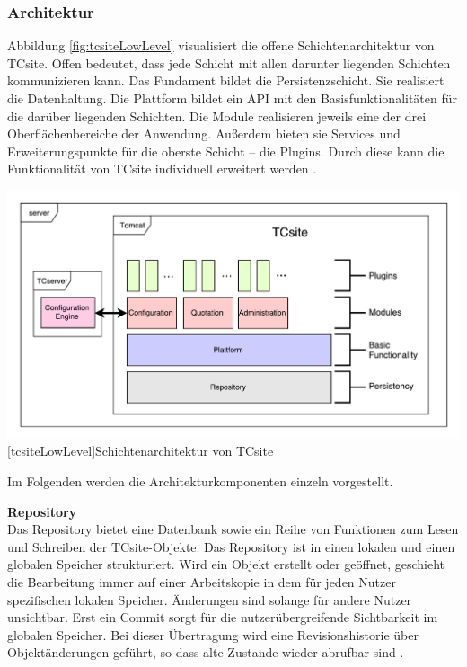 \documentclass[11pt, a4paper, titlepage, listof=totoc, bibliography=totoc, index=totoc, twoside, openright, headings=normal]{scrreprt}
\begin{document}
\subsubsection{Architektur}
\label{subsubsection:tcsiteArchitektur}

Abbildung \ref{fig:tcsiteLowLevel} visualisiert die offene Schichtenarchitektur von TCsite. Offen bedeutet, dass jede Schicht mit allen darunter liegenden Schichten kommunizieren kann. Das Fundament bildet die Persistenzschicht. Sie realisiert die Datenhaltung. Die Plattform bildet ein \ac{API} mit den Basisfunktionalitäten für die darüber liegenden Schichten. Die Module realisieren jeweils eine der drei Oberflächenbereiche der Anwendung. Außerdem bieten sie Services und Erweiterungspunkte für die oberste Schicht -- die Plugins. Durch diese kann die Funktionalität von TCsite individuell erweitert werden \citep{tactonTCsiteDevelopmentManual}.

\vspace{1em}
\begin{minipage}{\linewidth}
	\centering
	\includegraphics[width=1\linewidth]{Abbildungen/tcsiteLowLevel.pdf}
	[tcsiteLowLevel]{Schichtenarchitektur von TCsite}
	\label{fig:tcsiteLowLevel}
\end{minipage}
\vspace{1em}

Im Folgenden werden die Architekturkomponenten einzeln vorgestellt.

\textbf{Repository}\\
Das Repository bietet eine Datenbank sowie ein Reihe von Funktionen zum Lesen und Schreiben der TCsite-Objekte. Das Repository ist in einen lokalen und einen globalen Speicher strukturiert. Wird ein Objekt erstellt oder geöffnet, geschieht die Bearbeitung immer auf einer Arbeitskopie in dem für jeden Nutzer spezifischen lokalen Speicher. Änderungen sind solange für andere Nutzer unsichtbar. Erst ein Commit sorgt für die nutzerübergreifende Sichtbarkeit im globalen Speicher. Bei dieser Übertragung wird eine Revisionshistorie über Objektänderungen geführt, so dass alte Zustande wieder abrufbar sind \citep{tactonTCsiteDevelopmentManual}.
\end{document}
